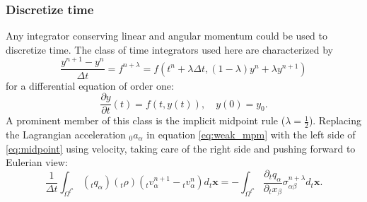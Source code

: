 \documentclass[m,times]{cgMA}
\begin{document}
\subsubsection{Discretize time}
Any integrator conserving linear and angular momentum could be used to discretize time. The class of time integrators used here are characterized by \begin{equation}\label{eq:midpoint}
  \frac{y ^ { n + 1 } - y ^ { n }}{ \Delta t} = f^{n+\lambda} = f \left(t^n+\lambda\Delta t, (1-\lambda) y ^ { n } +\lambda y^{n+1}\right)
\end{equation}
for a differential equation of order one:
\begin{equation}
  \frac{\partial y}{\partial t}( t ) = f (t,y(t)) , \quad y (0) = y _ { 0 }.
\end{equation}
A prominent member of this class is the implicit midpoint rule ($\lambda =\frac{1}{2}$). Replacing the Lagrangian acceleration $_0a_\alpha$ in equation \ref{eq:weak_mpm} with the left side of \ref{eq:midpoint} using velocity, taking care of the right side and pushing forward to Eulerian view:
\begin{equation}\label{eq:time_disc}
  \frac{1}{\Delta t} \int _{ \Omega^{t^n}}(_tq_\alpha)(_t\rho)({_tv_\alpha^{n+1}}-{_tv_\alpha^{n}}) d_t\boldsymbol{x} =
  -  \int _ { \Omega ^ { t^n} } \frac{\partial _tq _ \alpha}{\partial _tx_\beta} \sigma _ {\alpha\beta}^{n+\lambda} d_t\boldsymbol{x}.
\end{equation}
\end{document}
